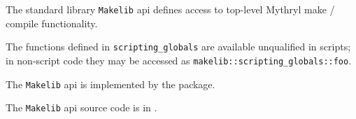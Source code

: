 
The standard library {\tt Makelib} api defines access to top-level Mythryl make / compile functionality.

The functions defined in {\tt scripting\_globals} are available unqualified in scripts; 
in non-script code they may be accessed as {\tt makelib::scripting\_globals::foo}. 

The {\tt Makelib} api is implemented by the  package.

The {\tt Makelib} api source code is in .

